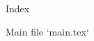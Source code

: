 {{\enditems




\sec Index

\def\_sortinglang{en}
\typosize[9/]
\makeindex
\endmulti

\bye













































































 Main file `main.tex`

\begtt
\load[opbible] %
\cslang

\def\shadowparameter{.1}%


}}
